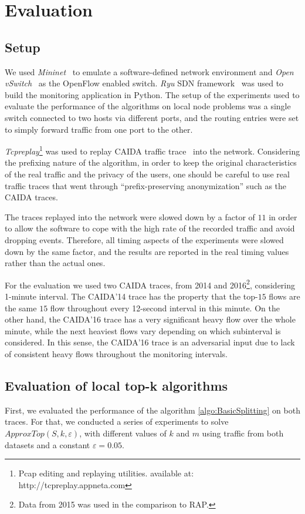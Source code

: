 \section{Evaluation}
\subsection{Setup}
We used \textit{Mininet}~\cite{conf/hotnets/LantzHM10, Mininet} to emulate a software-defined network environment and \textit{Open vSwitch}~\cite{Pfaff2009, OVS} as the OpenFlow enabled switch. \textit{Ryu} SDN framework~\cite{Ryu} was used to build the monitoring application in Python. The setup of the experiments used to evaluate the performance of the algorithms on local node problems was a single switch connected to two hosts via different ports, and the routing entries were set to simply forward traffic from one port to the other.

\textit{Tcpreplay}\footnote{Pcap editing and replaying utilities. available at: http://tcpreplay.appneta.com} was used to replay CAIDA traffic trace~\cite{CAIDA14, CAIDA2016} into the network. Considering the prefixing nature of the algorithm, in order to keep the original characteristics of the real traffic and the privacy of the users, one should be careful to use real traffic traces that went through ``prefix-preserving anonymization'' such as the CAIDA traces.

The traces replayed into the network were slowed down by a factor of $11$ in order to allow the software to cope with the high rate of the recorded traffic and avoid dropping events. Therefore, all timing aspects of the experiments were slowed down by the same factor, and the results are reported in the real timing values rather than the actual ones.

For the evaluation we used two CAIDA traces, from 2014 and 2016\footnote{Data from 2015 was used in the comparison to RAP.}, considering 1-minute interval. The CAIDA'14 trace has the property that the top-$15$ flows are the same $15$ flow throughout every 12-second interval in this minute.
On the other hand, the CAIDA'16 trace has a very significant heavy flow over the whole minute, while the next heaviest flows vary depending on which subinterval is considered. In this sense, the CAIDA'16 trace is an adversarial input due to lack of consistent heavy flows throughout the monitoring intervals.

\subsection{Evaluation of local top-k algorithms}
First, we evaluated the performance of the algorithm \ref{algo:BasicSplitting} on both traces. For that, we conducted a series of experiments to solve $ApproxTop(S,k,\varepsilon)$, with different values of $k$ and $m$ using traffic from both datasets and a constant $\varepsilon=0.05$.

